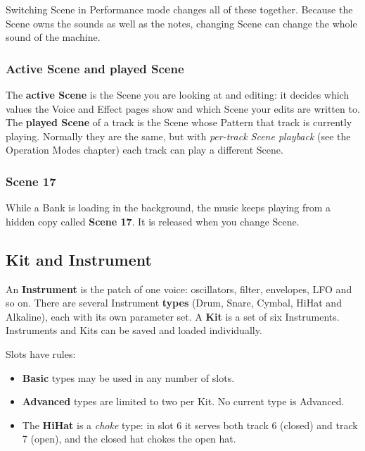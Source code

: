 Switching Scene in Performance mode changes all of these together.
Because the Scene owns the sounds as well as the notes, changing Scene
can change the whole sound of the machine.

\subsubsection{Active Scene and played
Scene}\label{active-scene-and-played-scene}

The \textbf{active Scene} is the Scene you are looking at and editing:
it decides which values the Voice and Effect pages show and which Scene
your edits are written to. The \textbf{played Scene} of a track is the
Scene whose Pattern that track is currently playing. Normally they are
the same, but with \emph{per-track Scene playback} (see the Operation
Modes chapter) each track can play a different Scene.

\subsubsection{Scene 17}\label{scene-17}

While a Bank is loading in the background, the music keeps playing from
a hidden copy called \textbf{Scene 17}. It is released when you change
Scene.

\subsection{Kit and Instrument}\label{kit-and-instrument}

An \textbf{Instrument} is the patch of one voice: oscillators, filter,
envelopes, LFO and so on. There are several Instrument \textbf{types}
(Drum, Snare, Cymbal, HiHat and Alkaline), each with its own parameter
set. A \textbf{Kit} is a set of six Instruments. Instruments and Kits
can be saved and loaded individually.

Slots have rules:

\begin{itemize}
\tightlist
\item
  \textbf{Basic} types may be used in any number of slots.
\item
  \textbf{Advanced} types are limited to two per Kit. No current type is
  Advanced.
\item
  The \textbf{HiHat} is a \emph{choke} type: in slot 6 it serves both
  track 6 (closed) and track 7 (open), and the closed hat chokes the
  open hat.
\end{itemize}

